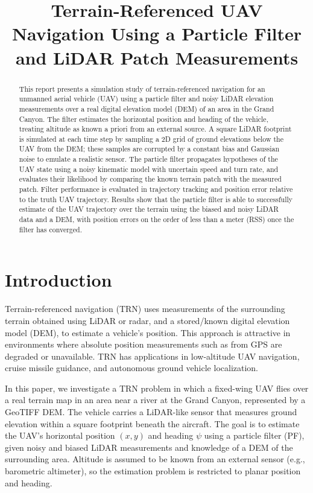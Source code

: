 \documentclass[conference]{IEEEtran}
\title{Terrain-Referenced UAV Navigation Using a Particle Filter and LiDAR Patch Measurements}
\author{
  \IEEEauthorblockN{Derek Yu}
  \IEEEauthorblockA{
    AAE 590 Fundamentals of Estimation - Final Project\\
    Purdue University\\
    Email: yu1481@purdue.edu
  }
}
\begin{document}
\maketitle

\begin{abstract}
This report presents a simulation study of terrain-referenced navigation for an unmanned aerial vehicle (UAV) using a particle filter and noisy LiDAR elevation measurements over a real digital elevation model (DEM) of an area in the Grand Canyon. The filter estimates the horizontal position and heading of the vehicle, treating altitude as known a priori from an external source. A square LiDAR footprint is simulated at each time step by sampling a 2D grid of ground elevations below the UAV from the DEM; these samples are corrupted by a constant bias and Gaussian noise to emulate a realistic sensor. The particle filter propagates hypotheses of the UAV state using a noisy kinematic model with uncertain speed and turn rate, and evaluates their likelihood by comparing the known terrain patch with the measured patch. Filter performance is evaluated in trajectory tracking and position error relative to the truth UAV trajectory. Results show that the particle filter is able to successfully estimate of the UAV trajectory over the terrain using the biased and noisy LiDAR data and a DEM, with position errors on the order of less than a meter (RSS) once the filter has converged.
\end{abstract}

\section{Introduction}
Terrain-referenced navigation (TRN) uses measurements of the surrounding terrain obtained using LiDAR or radar, and a stored/known digital elevation model (DEM), to estimate a vehicle's position. This approach is attractive in environments where absolute position measurements such as from GPS are degraded or unavailable. TRN has applications in low-altitude UAV navigation, cruise missile guidance, and autonomous ground vehicle localization.

In this paper, we investigate a TRN problem in which a fixed-wing UAV flies over a real terrain map in an area near a river at the Grand Canyon, represented by a GeoTIFF DEM. The vehicle carries a LiDAR-like sensor that measures ground elevation within a square footprint beneath the aircraft. The goal is to estimate the UAV's horizontal position $(x,y)$ and heading $\psi$ using a particle filter (PF), given noisy and biased LiDAR measurements and knowledge of a DEM of the surrounding area. Altitude is assumed to be known from an external sensor (e.g., barometric altimeter), so the estimation problem is restricted to planar position and heading.
\end{document}
